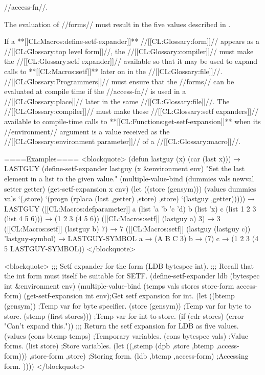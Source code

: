 //access-fn//.

The evaluation of //forms// must result in the five values described in \secref\SetfExpansions.

If a **[[CL:Macros:define-setf-expander]]** //[[CL:Glossary:form]]// appears as a //[[CL:Glossary:top level form]]//, the //[[CL:Glossary:compiler]]// must make the //[[CL:Glossary:setf expander]]// available so that it may be used to expand calls to **[[CL:Macros:setf]]** later on in the //[[CL:Glossary:file]]//. //[[CL:Glossary:Programmers]]// must ensure that the //forms// can be evaluated at compile time if the //access-fn// is used in a //[[CL:Glossary:place]]// later in the same //[[CL:Glossary:file]]//. The //[[CL:Glossary:compiler]]// must make these //[[CL:Glossary:setf expanders]]// available to compile-time calls to **[[CL:Functions:get-setf-expansion]]** when its //environment// argument is a value received as the //[[CL:Glossary:environment parameter]]// of a //[[CL:Glossary:macro]]//.

====Examples==== <blockquote> (defun lastguy (x) (car (last x))) → LASTGUY (define-setf-expander lastguy (x &environment env) "Set the last element in a list to the given value." (multiple-value-bind (dummies vals newval setter getter) (get-setf-expansion x env) (let ((store (gensym))) (values dummies vals `(,store) `(progn (rplaca (last ,getter) ,store) ,store) `(lastguy ,getter))))) → LASTGUY ([[CL:Macros:defparameter]] a (list 'a 'b 'c 'd) b (list 'x) c (list 1 2 3 (list 4 5 6))) → (1 2 3 (4 5 6)) ([[CL:Macros:setf]] (lastguy a) 3) → 3 ([[CL:Macros:setf]] (lastguy b) 7) → 7 ([[CL:Macros:setf]] (lastguy (lastguy c)) 'lastguy-symbol) → LASTGUY-SYMBOL a → (A B C 3) b → (7) c → (1 2 3 (4 5 LASTGUY-SYMBOL)) </blockquote>



<blockquote> ;;; Setf expander for the form (LDB bytespec int). ;;; Recall that the int form must itself be suitable for SETF. (define-setf-expander ldb (bytespec int &environment env) (multiple-value-bind (temps vals stores store-form access-form) (get-setf-expansion int env);Get setf expansion for int. (let ((btemp (gensym)) ;Temp var for byte specifier. (store (gensym)) ;Temp var for byte to store. (stemp (first stores))) ;Temp var for int to store. (if (cdr stores) (error "Can't expand this.")) ;;; Return the setf expansion for LDB as five values. (values (cons btemp temps) ;Temporary variables. (cons bytespec vals) ;Value forms. (list store) ;Store variables. \bq(let ((,stemp (dpb ,store ,btemp ,access-form))) ,store-form ,store) ;Storing form. \bq(ldb ,btemp ,access-form) ;Accessing form. )))) </blockquote>

